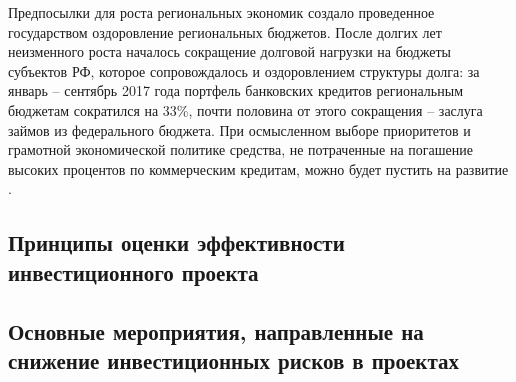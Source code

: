 Предпосылки для роста региональных экономик создало проведенное государством оздоровление региональных бюджетов. После долгих лет неизменного роста началось сокращение долговой нагрузки на бюджеты субъектов РФ, которое сопровождалось и оздоровлением структуры долга: за январь – сентябрь 2017 года портфель банковских кредитов региональным бюджетам сократился на 33\%, почти половина от этого сокращения – заслуга займов из федерального бюджета. При осмысленном выборе приоритетов и грамотной экономической политике средства, не потраченные на погашение высоких процентов по коммерческим кредитам, можно будет пустить на развитие \cite{expertra}.












\subsection{Принципы оценки эффективности инвестиционного проекта}
\subsection{Основные мероприятия, направленные на снижение инвестиционных рисков в проектах}